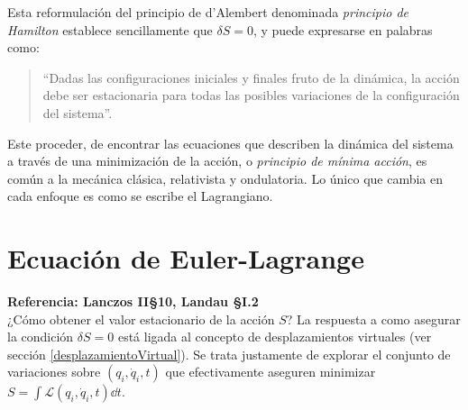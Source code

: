 \documentclass[12pt, spanish, a4paper, ]{article}
\begin{document}
Esta reformulación del principio de d'Alembert denominada \emph{principio de Hamilton} establece sencillamente que \(\delta S= 0\), y puede expresarse en palabras como:
\begin{quote}
``Dadas las configuraciones iniciales y finales fruto de la dinámica, la acción debe ser estacionaria para todas las posibles variaciones de la configuración del sistema''. 
\end{quote}

Este proceder, de encontrar las ecuaciones que describen la dinámica del sistema a través de una minimización de la acción, o \emph{principio de mínima acción}, es común a la mecánica clásica, relativista y ondulatoria.
Lo único que cambia en cada enfoque es como se escribe el Lagrangiano.


\section{Ecuación de Euler-Lagrange}\label{EulerLagrange} %
\textbf{Referencia: Lanczos II\S10, Landau \S I.2}\\
  


¿Cómo obtener el valor estacionario de la acción \(S\)?
La respuesta a como asegurar la condición \(\delta S= 0\) está ligada al concepto de desplazamientos virtuales (ver sección \ref{desplazamientoVirtual}).
Se trata justamente de explorar el conjunto de variaciones sobre \((q_i, \dot{q}_i, t)\) que efectivamente aseguren minimizar \(S= \int \mathcal{L}(q_i, \dot{q}_i, t) \dd t\).
\end{document}
